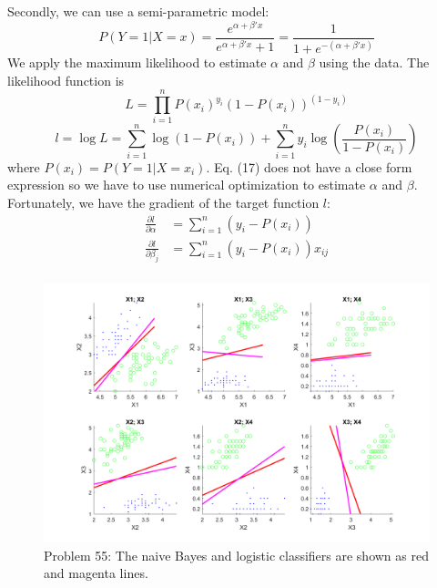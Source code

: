 \documentclass[a4paper, 11pt]{article}
\begin{document}
Secondly, we can use a semi-parametric model: 
\begin{equation}
P(Y=1|X=x) = \frac{e^{\alpha+\beta'x}}{e^{\alpha+\beta'x}+1} = \frac{1}{1+e^{-(\alpha+\beta'x)}}
\end{equation}
We apply the maximum likelihood to estimate $\alpha$ and $\beta$ using the data. The likelihood function is
\begin{equation}
L = \prod_{i=1}^nP(x_i)^{y_i}(1-P(x_i))^{(1-y_i)}
\end{equation}
\begin{equation}
l = \log L = \sum_{i=1}^n\log{(1-P(x_i))} + \sum_{i=1}^n y_i\log{\left(\frac{P(x_i)}{1-P(x_i)} \right)}
\end{equation}
where $P(x_i) = P(Y=1|X=x_i)$. Eq. (17) does not have a close form expression so we have to use numerical optimization to estimate $\alpha$ and $\beta$. Fortunately, we have the gradient of the target function $l$:
\begin{equation}
\begin{split}
\frac{\partial l}{\partial \alpha} & = \sum_{i=1}^n (y_i - P(x_i))\\
\frac{\partial l}{\partial \beta_j} & = \sum_{i=1}^n (y_i - P(x_i))x_{ij}\\
\end{split}
\end{equation}

\begin{figure}
	\begin{center}
		\includegraphics[width=6in]{p55.png}
		\caption{Problem 55: The naive Bayes and logistic classifiers are shown as red and magenta lines.}
	\end{center}
\end{figure}
\end{document}
